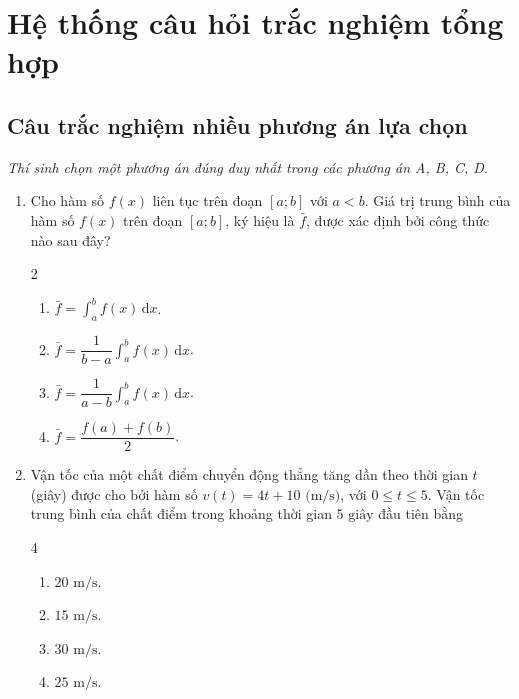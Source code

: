 \documentclass[12pt]{article}
\begin{document}
	\newpage
	
	\section{Hệ thống câu hỏi trắc nghiệm tổng hợp}\label{sec:tracnghiem}
	
	\subsection{Câu trắc nghiệm nhiều phương án lựa chọn}
	\textit{Thí sinh chọn một phương án đúng duy nhất trong các phương án A, B, C, D.}
	
	\begin{enumerate}[label=\textbf{Câu \arabic*.}]
		\item Cho hàm số $f(x)$ liên tục trên đoạn $[a; b]$ với $a < b$. Giá trị trung bình của hàm số $f(x)$ trên đoạn $[a; b]$, ký hiệu là $\bar{f}$, được xác định bởi công thức nào sau đây?
		\begin{multicols}{2}
			\begin{enumerate}[label=\textbf{\Alph*.}]
				\item $\bar{f} = \displaystyle \int_a^b f(x)\,\mathrm{d}x$.
				\item $\bar{f} = \dfrac{1}{b - a} \displaystyle \int_a^b f(x)\,\mathrm{d}x$.
				\item $\bar{f} = \dfrac{1}{a - b} \displaystyle \int_a^b f(x)\,\mathrm{d}x$.
				\item $\bar{f} = \dfrac{f(a) + f(b)}{2}$.
			\end{enumerate}
		\end{multicols}
		
		\item Vận tốc của một chất điểm chuyển động thẳng tăng dần theo thời gian $t$ (giây) được cho bởi hàm số $v(t) = 4t + 10\text{ (m/s)}$, với $0 \le t \le 5$. Vận tốc trung bình của chất điểm trong khoảng thời gian $5\text{ giây}$ đầu tiên bằng
		\begin{multicols}{4}
			\begin{enumerate}[label=\textbf{\Alph*.}]
				\item $20\text{ m/s}$.
				\item $15\text{ m/s}$.
				\item $30\text{ m/s}$.
				\item $25\text{ m/s}$.
			\end{enumerate}
		\end{multicols}
		

\end{enumerate}
\end{document}
